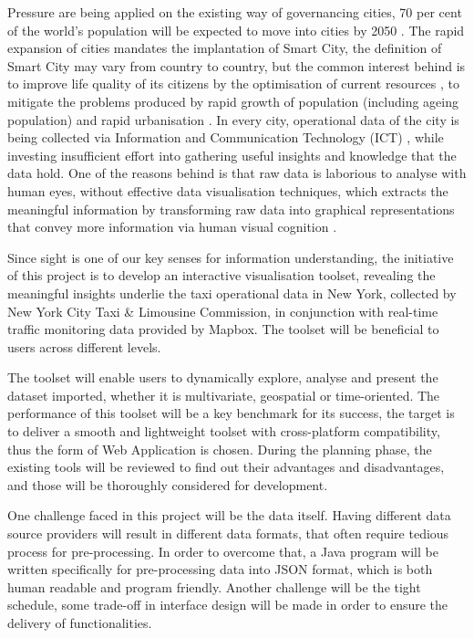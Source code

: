 \documentclass[11pt,a4paper]{article}
\begin{document}
Pressure are being applied on the existing way of governancing cities, 70 per cent of the world's population will be expected to move into cities by 2050 \parencite{UnitedNations2014}. The rapid expansion of cities mandates the implantation of Smart City, the definition of Smart City may vary from country to country, but the common interest behind is to improve life quality of its citizens by the optimisation of current resources \parencite{Lazaroiu2012}, to mitigate the problems produced by rapid growth of population (including ageing population) and rapid urbanisation \parencite{Chourabi2011}. In every city, operational data of the city is being collected via Information and Communication Technology (ICT) \parencite{Deakin2011}, while investing insufficient effort into gathering useful insights and knowledge that the data hold. One of the reasons behind is that raw data is laborious to analyse with human eyes, without effective data visualisation techniques, which extracts the meaningful information by transforming raw data into graphical representations that convey more information via human visual cognition \parencite{Ward2010}. 

Since sight is one of our key senses for information understanding, the initiative of this project is to develop an interactive visualisation toolset, revealing the meaningful insights underlie the taxi operational data in New York, collected by New York City Taxi \& Limousine Commission, in conjunction with real-time traffic monitoring data provided by Mapbox. The toolset will be beneficial to users across different levels.

The toolset will enable users to dynamically explore, analyse and present the dataset imported, whether it is multivariate, geospatial or time-oriented. The performance of this toolset will be a key benchmark for its success, the target is to deliver a smooth and lightweight toolset with cross-platform compatibility, thus the form of Web Application is chosen. During the planning phase, the existing tools will be reviewed to find out their advantages and disadvantages, and those will be thoroughly considered for development.

One challenge faced in this project will be the data itself. Having different data source providers will result in different data formats, that often require tedious process for pre-processing. In order to overcome that, a Java program will be written specifically for pre-processing data into JSON format, which is both human readable and program friendly. Another challenge will be the tight schedule, some trade-off in interface design will be made in order to ensure the delivery of functionalities.
\end{document}
